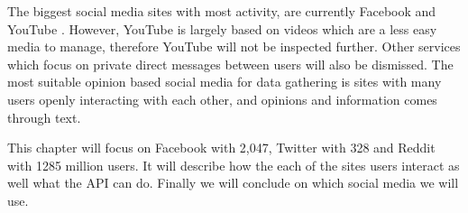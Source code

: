 The biggest social media sites with most activity, are currently Facebook and
YouTube \citep{SocialMediaStats}.
However, YouTube is largely based on videos which are a less easy media to
manage, therefore YouTube will not be inspected further. Other services which
focus on private direct messages between users will also be dismissed. The most
suitable opinion based social media for data gathering is sites with many users
openly interacting with each other, and opinions and information comes through
text.\nl

This chapter will focus on Facebook with 2,047, Twitter with 328 and
Reddit with 1285 million users. It will describe how the each of the sites
users interact as well what the API can do. Finally we will conclude on which
social media we will use.
